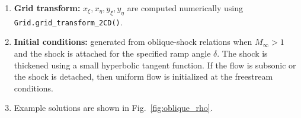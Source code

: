 \documentclass[letterpaper,10pt]{article}
\begin{document}
\begin{enumerate}
\begin{itemize}
  \item Definition (unstretched, including ramp function $y_{R,i}$):
  \begin{align*}
    x_{ij} &= \xi_i \\
    y_{ij} &= \eta_j + y_{R,i} \\
    y_{R,i} &= (\underbrace{\alpha (\exp(\min(0,\xi_i))-1) + 1}_{\text{ELU ramp for } \xi\leq0}
    + \underbrace{\max(0,\xi_i)}_{\text{Linear ramp for } \xi>0})\tan(\delta)
    \underbrace{(1-\eta_j/L_y)}_\text{Make ramp vanish at top}
  \end{align*}
  \begin{itemize}
  \item Physical domain extents: $x\in[-L_x/2,L_x/2]$, $y\in[0,L_y]$
  \item $\alpha=1.0$
  \item $\delta$: ramp angle
  \end{itemize}
    
  \item Definition (stretched):
  \begin{align*}
    x_{ij} &= \frac{L_x}{2} \frac{\sinh(2s_x \xi_i/L_x)}{\sinh(s_x)} \\
    y_{ij} &= \frac{L_y}{2}\left(\frac{\tanh(s_y(2\eta_j/L_y - 1))}{\tanh(s_y)} + 1\right) + y_{R,i} \qquad \text{(bottom and top stretching)} \\
    y_{ij} &= L_y\left(\frac{\tanh(s_y(\eta_j/L_y - 1))}{\tanh(s_y)} + 1\right) + y_{R,i} \qquad \text{(bottom stretching only)}
  \end{align*}
  \begin{itemize}
  \item Physical domain extents: $x\in[-L_x/2,L_x/2]$, $y\in[0,L_y]$
  \item $\alpha=1.0$
  \item $s_x$, $s_y$: stretching parameters
  \item Same ramp function as uniform grid
  \end{itemize}
  \end{itemize}

\item \textbf{Grid transform:} $x_\xi,x_\eta,y_\xi,y_\eta$ are computed numerically using \texttt{Grid.grid\_transform\_2CD()}.

\item \textbf{Initial conditions:} generated from oblique-shock relations when $M_\infty>1$ and the shock is attached for the specified ramp angle $\delta$. The shock is thickened using a small hyperbolic tangent function. If the flow is subsonic or the shock is detached, then uniform flow is initialized at the freestream conditions.

\item Example solutions are shown in Fig.~\ref{fig:oblique_rho}.
  
\end{enumerate}
\end{document}
